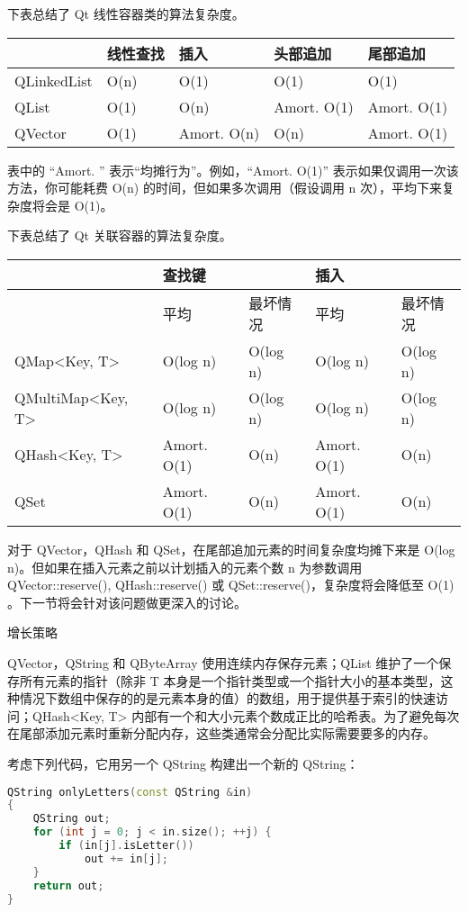 下表总结了 Qt 线性容器类的算法复杂度。

\begin{tabular}{|l|l|l|l|l|}
\hline
&线性查找	&插入	&头部追加&	尾部追加\\
\hline
QLinkedList&	O(n)&	O(1)&	O(1)&	O(1)\\
\hline
QList&	O(1)&	O(n)&	Amort. O(1)	&Amort. O(1)\\
\hline
QVector&	O(1)&	Amort. O(n)&	O(n)	&Amort. O(1)\\
\hline
\end{tabular}

表中的 “Amort. ” 表示“均摊行为”。例如，“Amort. O(1)” 表示如果仅调用一次该方法，你可能耗费 O(n) 的时间，但如果多次调用（假设调用 n 次），平均下来复杂度将会是 O(1)。

下表总结了 Qt 关联容器的算法复杂度。


\begin{tabular}{|l|l|l|l|l|}
\hline
&查找键	&&	插入&	\\
\hline
&平均&	最坏情况&	平均&	最坏情况\\
\hline
QMap<Key, T>&	O(log n)&	O(log n)&	O(log n)&	O(log n)\\
\hline
QMultiMap<Key, T>&	O(log n)	&O(log n)&	O(log n)&	O(log n)\\
\hline
QHash<Key, T>&	Amort. O(1)&	O(n)&	Amort. O(1)&	O(n)\\
\hline
QSet&	Amort. O(1)&	O(n)	&Amort. O(1)	&O(n)\\
\hline
\end{tabular}

对于 QVector，QHash 和 QSet，在尾部追加元素的时间复杂度均摊下来是 O(log n)。但如果在插入元素之前以计划插入的元素个数 n 为参数调用 QVector::reserve(), QHash::reserve() 或 QSet::reserve()，复杂度将会降低至 O(1) 。下一节将会针对该问题做更深入的讨论。

\splitLine

增长策略

QVector，QString 和 QByteArray 使用连续内存保存元素；QList 维护了一个保存所有元素的指针（除非 T 本身是一个指针类型或一个指针大小的基本类型，这种情况下数组中保存的的是元素本身的值）的数组，用于提供基于索引的快速访问；QHash<Key, T> 内部有一个和大小元素个数成正比的哈希表。为了避免每次在尾部添加元素时重新分配内存，这些类通常会分配比实际需要要多的内存。

考虑下列代码，它用另一个 QString 构建出一个新的 QString：


\begin{lstlisting}[language=C++]
QString onlyLetters(const QString &in)
{
    QString out;
    for (int j = 0; j < in.size(); ++j) {
        if (in[j].isLetter())
            out += in[j];
    }
    return out;
}
\end{lstlisting}

